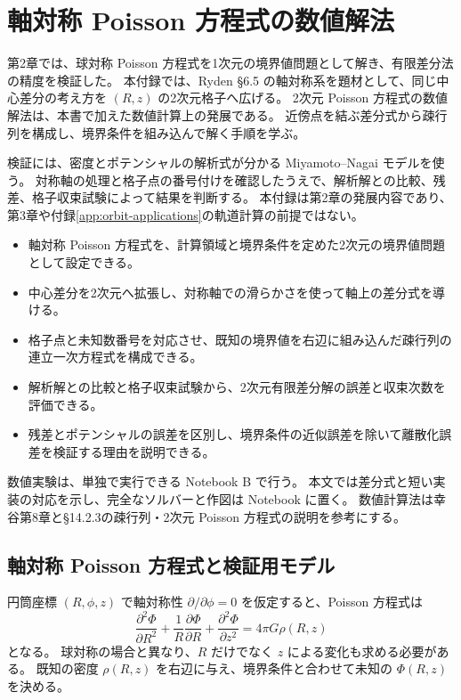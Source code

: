 \chapter{軸対称 Poisson 方程式の数値解法}
\label{app:axisym-poisson}

第2章では、球対称 Poisson 方程式を1次元の境界値問題として解き、有限差分法の精度を検証した。
本付録では、Ryden §6.5 の軸対称系を題材として、同じ中心差分の考え方を $(R,z)$ の2次元格子へ広げる\cite{ryden2025}。
2次元 Poisson 方程式の数値解法は、本書で加えた数値計算上の発展である。
近傍点を結ぶ差分式から疎行列を構成し、境界条件を組み込んで解く手順を学ぶ。

検証には、密度とポテンシャルの解析式が分かる Miyamoto--Nagai モデルを使う。
対称軸の処理と格子点の番号付けを確認したうえで、解析解との比較、残差、格子収束試験によって結果を判断する。
本付録は第2章の発展内容であり、第3章や付録\ref{app:orbit-applications}の軌道計算の前提ではない。

\begin{learningbox}[本付録で学ぶこと]
\begin{itemize}
\item 軸対称 Poisson 方程式を、計算領域と境界条件を定めた2次元の境界値問題として設定できる。
\item 中心差分を2次元へ拡張し、対称軸での滑らかさを使って軸上の差分式を導ける。
\item 格子点と未知数番号を対応させ、既知の境界値を右辺に組み込んだ疎行列の連立一次方程式を構成できる。
\item 解析解との比較と格子収束試験から、2次元有限差分解の誤差と収束次数を評価できる。
\item 残差とポテンシャルの誤差を区別し、境界条件の近似誤差を除いて離散化誤差を検証する理由を説明できる。
\end{itemize}
\end{learningbox}

数値実験は、単独で実行できる Notebook B で行う。
本文では差分式と短い実装の対応を示し、完全なソルバーと作図は Notebook に置く。
数値計算法は幸谷第8章と§14.2.3の疎行列・2次元 Poisson 方程式の説明を参考にする\cite{kouya2021}。

\section{軸対称 Poisson 方程式と検証用モデル}
\label{sec:appB-2d-poisson-intro}

円筒座標 $(R,\phi,z)$ で軸対称性 $\partial/\partial\phi=0$ を仮定すると、Poisson 方程式は
\begin{equation}
 \boxed{\frac{\partial^2\Phi}{\partial R^2}+\frac{1}{R}\frac{\partial\Phi}{\partial R}+\frac{\partial^2\Phi}{\partial z^2}=4\pi G\rho(R,z)}
\label{eq:appB-axisym-poisson}
\end{equation}
となる。
球対称の場合と異なり、$R$ だけでなく $z$ による変化も求める必要がある。
既知の密度 $\rho(R,z)$ を右辺に与え、境界条件と合わせて未知の $\Phi(R,z)$ を決める。

